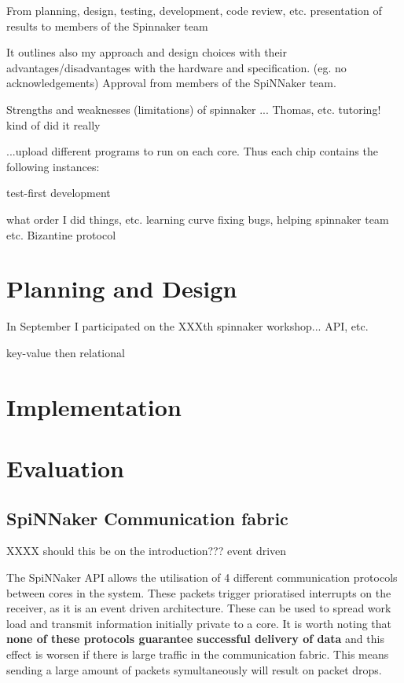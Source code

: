 From planning, design, testing, development, code review, etc. presentation of results to members of the Spinnaker team

It outlines also my approach and design choices with their advantages/disadvantages with the hardware and specification. (eg. no acknowledgements)
Approval from members of the SpiNNaker team.

Strengths and weaknesses (limitations) of spinnaker
...
Thomas, etc.
tutoring! kind of did it really


...upload different programs to run on each core.
Thus each chip contains the following instances: 

test-first development

what order I did things, etc.
learning curve
fixing bugs, helping spinnaker team etc.
Bizantine protocol

\section{Planning and Design}
In September I participated on the XXXth spinnaker workshop...
API, etc.

key-value then relational

\section{Implementation}

\section{Evaluation}

\subsection{SpiNNaker Communication fabric}

XXXX should this be on the introduction???
event driven

The SpiNNaker API allows the utilisation of 4 different communication protocols between cores in the system. These packets trigger prioratised interrupts on the receiver, as it is an event driven architecture. These can be used to spread work load and transmit information initially private to a core.
It is worth noting that \textbf{none of these protocols guarantee successful delivery of data} and this effect is worsen if there is large traffic in the communication fabric. This means sending a large amount of packets symultaneously will result on packet drops.

